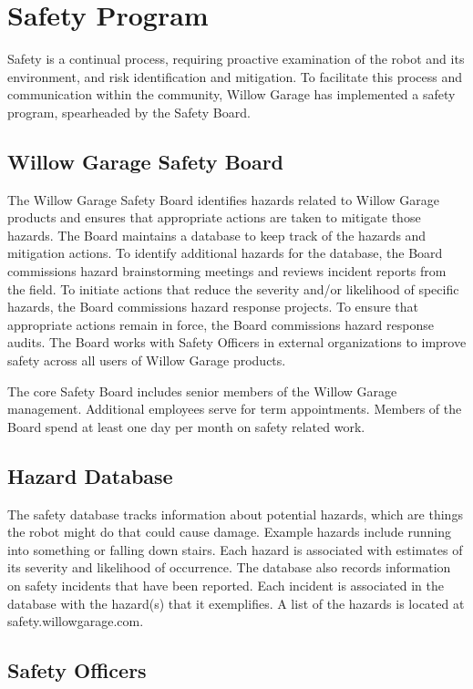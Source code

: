 \section{Safety Program}
Safety is a continual process, requiring proactive examination of the robot and its environment, and risk identification and mitigation. To facilitate this process and communication within the community, Willow Garage has implemented a safety program, spearheaded by the Safety Board.

\subsection{Willow Garage Safety Board}
The Willow Garage Safety Board identifies hazards related to Willow Garage products and ensures that appropriate actions are taken to mitigate those hazards. The Board maintains a database to keep track of the hazards and mitigation actions. To identify additional hazards for the database, the Board commissions hazard brainstorming meetings and reviews incident reports from the field. To initiate actions that reduce the severity and/or likelihood of specific hazards, the Board commissions hazard response projects. To ensure that appropriate actions remain in force, the Board commissions hazard response audits. The Board works with Safety Officers in external organizations to improve safety across all users of Willow Garage products.

The core Safety Board includes senior members of the Willow Garage management. Additional employees serve for term appointments. Members of the Board spend at least one day per month on safety related work.

\subsection{Hazard Database}
The safety database tracks information about potential hazards, which are things the robot might do that could cause damage. Example hazards include running into something or falling down stairs. Each hazard is associated with estimates of its severity and likelihood of occurrence. The database also records information on safety incidents that have been reported. Each incident is associated in the database with the hazard(s) that it exemplifies. A list of the hazards is located at safety.willowgarage.com.

\subsection{Safety Officers}

